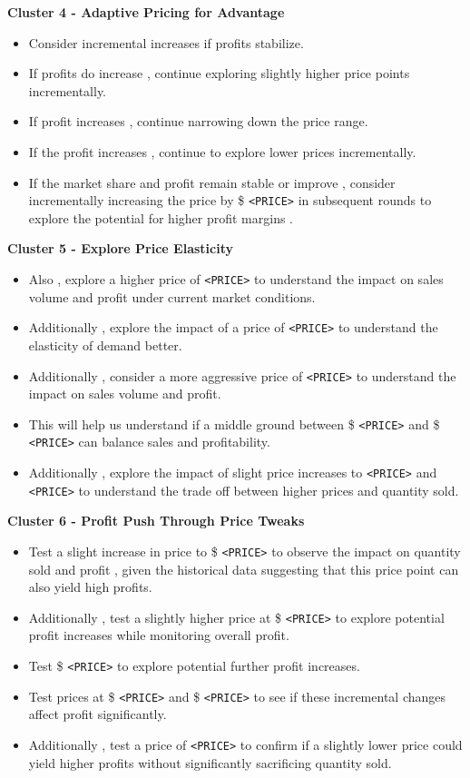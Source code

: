 \textbf{Cluster 4 - Adaptive Pricing for Advantage}
\begin{itemize}
    \item Consider incremental increases if profits stabilize.
    \item If profits do increase , continue exploring slightly higher price points incrementally.
    \item If profit increases , continue narrowing down the price range.
    \item If the profit increases , continue to explore lower prices incrementally.
    \item If the market share and profit remain stable or improve , consider incrementally increasing the price by \$ \texttt{<PRICE>} in subsequent rounds to explore the potential for higher profit margins .
\end{itemize}

\textbf{Cluster 5 - Explore Price Elasticity}
\begin{itemize}
    \item Also , explore a higher price of \texttt{<PRICE>} to understand the impact on sales volume and profit under current market conditions.
    \item Additionally , explore the impact of a price of \texttt{<PRICE>} to understand the elasticity of demand better.
    \item Additionally , consider a more aggressive price of \texttt{<PRICE>} to understand the impact on sales volume and profit.
    \item This will help us understand if a middle ground between \$ \texttt{<PRICE>} and \$ \texttt{<PRICE>} can balance sales and profitability.
    \item Additionally , explore the impact of slight price increases to \texttt{<PRICE>} and \texttt{<PRICE>} to understand the trade off between higher prices and quantity sold.
\end{itemize}

\textbf{Cluster 6 - Profit Push Through Price Tweaks}
\begin{itemize}
    \item Test a slight increase in price to \$ \texttt{<PRICE>} to observe the impact on quantity sold and profit , given the historical data suggesting that this price point can also yield high profits.
    \item Additionally , test a slightly higher price at \$ \texttt{<PRICE>} to explore potential profit increases while monitoring overall profit.
    \item Test \$ \texttt{<PRICE>} to explore potential further profit increases.
    \item Test prices at \$ \texttt{<PRICE>} and \$ \texttt{<PRICE>} to see if these incremental changes affect profit significantly.
    \item Additionally , test a price of \texttt{<PRICE>} to confirm if a slightly lower price could yield higher profits without significantly sacrificing quantity sold.
\end{itemize}

